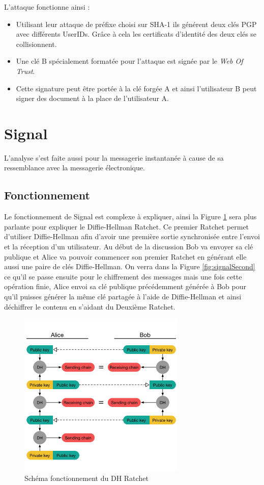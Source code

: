 L'attaque fonctionne ainsi : 
\begin{itemize}
	\item Utilisant leur attaque de préfixe choisi sur SHA-1 ils générent deux clés PGP avec différents UserIDs. Grâce à cela les certificats d'identité des deux clés se collisionnent.
	\item Une clé B spécialement formatée pour l'attaque est signée par le \textit{Web Of Trust}.
	\item Cette signature peut être portée à la clé forgée A et ainsi l'utilisateur B peut signer des document à la place de l'utilisateur A.
\end{itemize}
\section{Signal}
L'analyse s'est faite aussi pour la messagerie instantanée à cause de sa ressemblance avec la messagerie électronique. 
\subsection{Fonctionnement}
Le fonctionnement de Signal est complexe à expliquer, ainsi la Figure \ref{fig:signal} sera plus parlante pour expliquer le Diffie-Hellman Ratchet. Ce premier Ratchet permet d'utiliser Diffie-Hellman afin d'avoir une première sortie synchronisée entre l'envoi et la réception d'un utilisateur. Au début de la discussion Bob va envoyer sa clé publique et Alice va pouvoir commencer son premier Ratchet en générant elle aussi une paire de clés Diffie-Hellman. On verra dans la Figure \ref{fig:signalSecond} ce qu'il se passe ensuite pour le chiffrement des messages mais une fois cette opération finie, Alice envoi sa clé publique précédemment générée à Bob pour qu'il puisses générer la même clé partagée à l'aide de Diffie-Hellman et ainsi déchiffrer le contenu en s'aidant du Deuxième Ratchet.

\begin{figure}[h!]
	\centering
	\includegraphics[width=8cm]{images/signalFonctionnement.png}
	\caption{Schéma fonctionnement du DH Ratchet~\cite{doubleratchet}}
	\label{fig:signal}
\end{figure}

